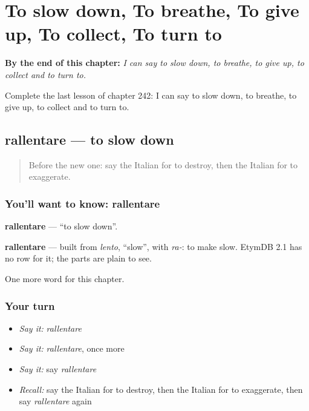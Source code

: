
\chapter{To slow down, To breathe, To give up, To collect, To turn to}
\label{ch:it-to-slow-down-to-breathe-to-give-up-to-collect-to-turn-to}

\begin{chapteropening}
\textbf{By the end of this chapter:} \emph{I can say to slow down, to breathe, to give up, to collect and to turn to.}

Complete the last lesson of chapter 242: I can say to slow down, to breathe, to give up, to collect and to turn to.
\end{chapteropening}

\section[rallentare]{rallentare — to slow down}

\label{lesson:IT-C242-rallentare}



\begin{quote}
Before the new one: say the Italian for to destroy, then the Italian for to exaggerate.
\end{quote}

\subsection*{You'll want to know: rallentare}
\textbf{rallentare} — \textquotedblleft{}to slow down\textquotedblright{}.

\begin{cousinweb}
\textbf{rallentare} — built from \emph{lento}, \textquotedblleft{}slow\textquotedblright{}, with \emph{ra-}: to make slow. EtymDB 2.1 has no row for it; the parts are plain to see.
\end{cousinweb}

\begin{grammarlens}[title={What you've built}]
One more word for this chapter.
\end{grammarlens}

\subsection*{Your turn}
\begin{itemize}
\raggedright
  \item \emph{Say it:} \emph{rallentare}
  \item \emph{Say it:} \emph{rallentare}, once more
  \item \emph{Say it:} say \emph{rallentare}
  \item \emph{Recall:} say the Italian for to destroy, then the Italian for to exaggerate, then say \emph{rallentare} again
\end{itemize}

